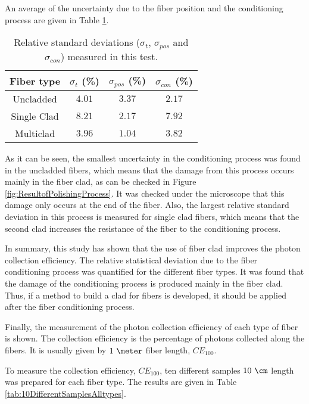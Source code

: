 An average of the uncertainty due to the fiber position and the conditioning process are given in Table \ref{tab:RelativeStandardDeviations}.

\begin{table}[htbp]
\begin{center}
\begin{tabular}{|c|c|c|c|}
\hline
Fiber type & $\sigma_t$ (\%) & $\sigma_{pos}$ (\%) & $\sigma_{con}$ (\%)\\\hline \hline \hline
Uncladded & $4.01$ & $3.37$ & $2.17$ \\ \hline
Single Clad & $8.21$ & $2.17$ & $7.92$ \\ \hline
Multiclad & $3.96$ & $1.04$ & $3.82$ \\ \hline
\end{tabular}
\caption{Relative standard deviations ($\sigma_t$, $\sigma_{pos}$ and $\sigma_{con}$) measured in this test.}
\label{tab:RelativeStandardDeviations}
\end{center}
\end{table}

As it can be seen, the smallest uncertainty in the conditioning process was found in the uncladded fibers, which means that the damage from this process occurs mainly in the fiber clad, as can be checked in Figure \ref{fig:ResultofPolishingProcess}. It was checked under the microscope that this damage only occurs at the end of the fiber. Also, the largest relative standard deviation in this process is measured for single clad fibers, which means that the second clad increases the resistance of the fiber to the conditioning process.

In summary, this study has shown that the use of fiber clad improves the photon collection efficiency. The relative statistical deviation due to the fiber conditioning process was quantified for the different fiber types. It was found that the damage of the conditioning process is produced mainly in the fiber clad. Thus, if a method to build a clad for fibers is developed, it should be applied after the fiber conditioning process.

Finally, the measurement of the photon collection efficiency of each type of fiber is shown. The collection efficiency is the percentage of photons collected along the fibers. It is usually given by $1~\meter$ fiber length, $CE_ {100}$.

To measure the collection efficiency, $CE_{100}$, ten different samples $10~\cm$ length was prepared for each fiber type. The results are given in Table \ref{tab:10DifferentSamplesAlltypes}.

